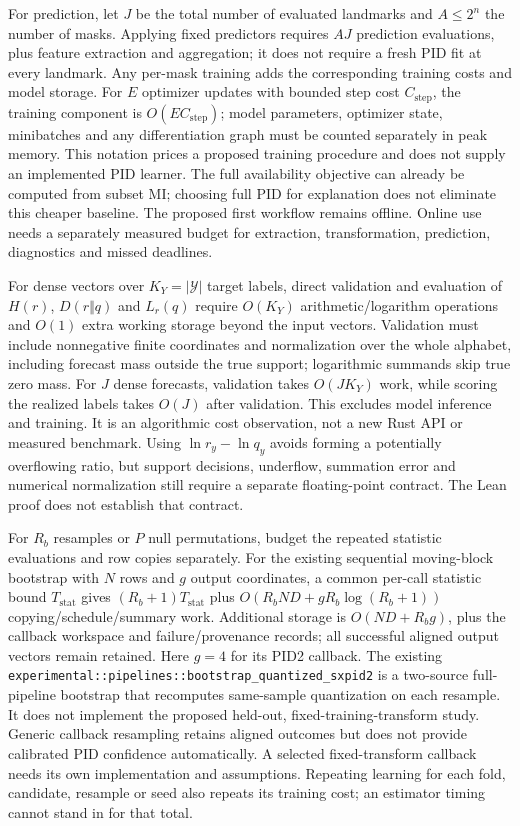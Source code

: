 \documentclass[11pt,a4paper]{article}
\let\PidSavedTexttt\texttt
\renewcommand{\texttt}[1]{\PidSavedTexttt{#1}}
\begin{document}
For prediction, let \(J\) be the total number of evaluated landmarks and \(A\leq2^n\) the number of masks. Applying fixed predictors requires \(AJ\) prediction evaluations, plus feature extraction and aggregation; it does not require a fresh PID fit at every landmark. Any per-mask training adds the corresponding training costs and model storage. For \(E\) optimizer updates with bounded step cost \(C_{\mathrm{step}}\), the training component is \(O(EC_{\mathrm{step}})\); model parameters, optimizer state, minibatches and any differentiation graph must be counted separately in peak memory. This notation prices a proposed training procedure and does not supply an implemented PID learner. The full availability objective can already be computed from subset MI; choosing full PID for explanation does not eliminate this cheaper baseline. The proposed first workflow remains offline. Online use needs a separately measured budget for extraction, transformation, prediction, diagnostics and missed deadlines.

For dense vectors over \(K_Y=|\mathcal Y|\) target labels, direct validation and evaluation of \(H(r)\), \(D(r\Vert q)\) and \(L_r(q)\) require \(O(K_Y)\) arithmetic/logarithm operations and \(O(1)\) extra working storage beyond the input vectors. Validation must include nonnegative finite coordinates and normalization over the whole alphabet, including forecast mass outside the true support; logarithmic summands skip true zero mass. For \(J\) dense forecasts, validation takes \(O(JK_Y)\) work, while scoring the realized labels takes \(O(J)\) after validation. This excludes model inference and training. It is an algorithmic cost observation, not a new Rust API or measured benchmark. Using \(\ln r_y-\ln q_y\) avoids forming a potentially overflowing ratio, but support decisions, underflow, summation error and numerical normalization still require a separate floating-point contract. The Lean proof does not establish that contract.

For \(R_b\) resamples or \(P\) null permutations, budget the repeated statistic evaluations and row copies separately. For the existing sequential moving-block bootstrap with \(N\) rows and \(g\) output coordinates, a common per-call statistic bound \(T_{\mathrm{stat}}\) gives \((R_b+1)T_{\mathrm{stat}}\) plus \(O(R_bND+gR_b\log(R_b+1))\) copying/schedule/summary work. Additional storage is \(O(ND+R_bg)\), plus the callback workspace and failure/provenance records; all successful aligned output vectors remain retained. Here \(g=4\) for its PID2 callback. The existing \texttt{experimental::\allowbreak{}pipelines::\allowbreak{}bootstrap\_\allowbreak{}quantized\_\allowbreak{}sxpid2} is a two-source full-pipeline bootstrap that recomputes same-sample quantization on each resample. It does not implement the proposed held-out, fixed-training-transform study. Generic callback resampling retains aligned outcomes but does not provide calibrated PID confidence automatically. A selected fixed-transform callback needs its own implementation and assumptions. Repeating learning for each fold, candidate, resample or seed also repeats its training cost; an estimator timing cannot stand in for that total.
\end{document}
